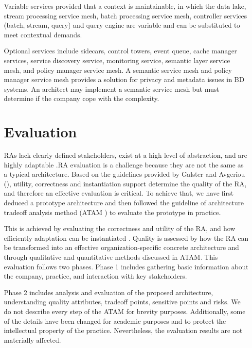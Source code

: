 \documentclass[conference]{IEEEtran}
\begin{document}
Variable services provided that  a context is maintainable, in which the data lake, stream processing service mesh, batch processing service mesh, controller services (batch, stream, query) and query engine are variable and can be substituted to meet contextual demands.

Optional services include sidecars, control towers, event queue, cache manager services, service discovery service, monitoring service, semantic layer service mesh, and policy manager service mesh. A semantic service mesh and policy manager service mesh provides a solution for privacy and metadata issues in BD systems. An architect may implement a semantic service mesh but must determine if the company cope with the complexity.

\section{Evaluation}

RAs lack clearly defined stakeholders, exist at a high level of abstraction, and are highly adaptable \cite{AtaeiACIS}.RA evaluation is a challenge \cite{angelov2008contracting,Avgeriou,Cioroaica,Maier} because they are not the same as a typical architecture. Based on the guidelines provided by Galster and Avgeriou (\cite{GALSTER}), utility, correctness and instantiation support determine the quality of the RA, and therefore an effective evaluation is critical. To achieve that, we have first deduced a prototype architecture and then followed the guideline of architecture tradeoff analysis method (ATAM \cite{KazmanATAM}) to evaluate the prototype in practice.

This is achieved by evaluating the correctness and utility of the RA, and how efficiently adaptation can be instantiated \cite{GALSTER}. Quality is assessed by how the RA can be transformed into an effective organization-specific concrete architecture and through qualitative and quantitative methods discussed in ATAM. This evaluation follows two phases. Phase 1 includes gathering basic information about the company, practice, and interaction with key stakeholders. 

Phase 2 includes analysis and evaluation of the proposed architecture, understanding quality attributes, tradeoff points, sensitive points and risks. We do not describe every step of the ATAM for brevity purposes. Additionally, some of the details have been changed for academic purposes and to protect the intellectual property of the practice. Nevertheless, the evaluation results are not materially affected.
\end{document}

